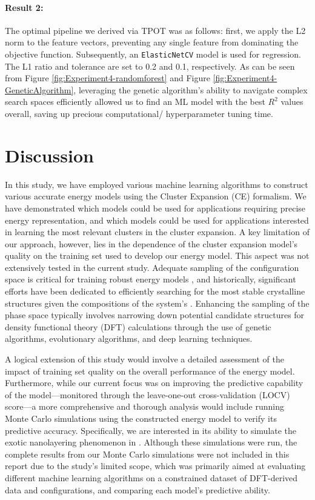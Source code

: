 \documentclass{article}
\begin{document}
\paragraph{Result 2:} The optimal pipeline we derived via TPOT was as follows: first, we apply the L2 norm to the feature vectors, preventing any single feature from dominating the objective function. Subsequently, an \texttt{ElasticNetCV} model is used for regression. The L1 ratio and tolerance are set to 0.2 and 0.1, respectively. 
As can be seen from Figure \ref{fig:Experiment4-randomforest} and Figure \ref{fig:Experiment4-GeneticAlgorithm}, leveraging the genetic algorithm's ability to navigate complex search spaces efficiently allowed us to find an ML model with the best $R^2$ values overall, saving up precious computational/ hyperparameter tuning time. 

\section{Discussion}
In this study, we have employed various machine learning algorithms to construct various accurate energy models using the Cluster Expansion (CE) formalism. We have demonstrated which models could be used for applications requiring precise energy representation, and which models could be used for applications interested in learning the most relevant clusters in the cluster expansion. A key limitation of our approach, however, lies in the dependence of the cluster expansion model's quality on the training set used to develop our energy model. This aspect was not extensively tested in the current study. Adequate sampling of the configuration space is critical for training robust energy models , and historically, significant efforts have been dedicated to efficiently searching for the most stable crystalline structures given the compositions of the system's \cite{pyGACE}. Enhancing the sampling of the phase space typically involves narrowing down potential candidate structures for density functional theory (DFT) calculations through the use of genetic algorithms, evolutionary algorithms, and deep learning techniques.

A logical extension of this study would involve a detailed assessment of the impact of training set quality on the overall performance of the energy model. Furthermore, while our current focus was on improving the predictive capability of the model—monitored through the leave-one-out cross-validation (LOCV) score—a more comprehensive and thorough analysis would include running Monte Carlo simulations using the constructed energy model to verify its predictive accuracy. Specifically, we are interested in its ability to simulate the exotic nanolayering phenomenon in . Although these simulations were run, the complete results from our Monte Carlo simulations were not included in this report due to the study's limited scope, which was primarily aimed at evaluating different machine learning algorithms on a constrained dataset of DFT-derived data and configurations, and comparing each model's predictive ability. 
\end{document}
